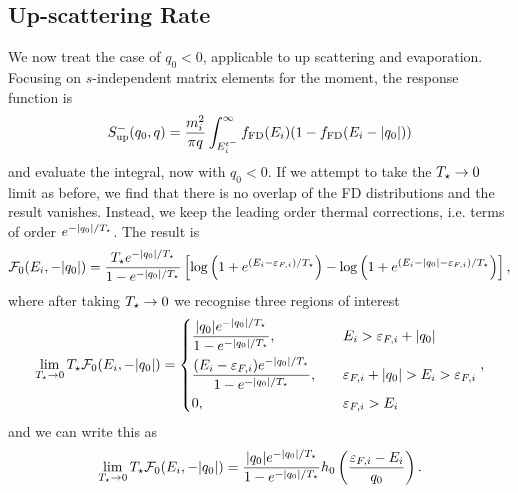 \subsection{Up-scattering Rate}
\label{app:subsec:up_scatter_derivation}

We now treat the case of $q_0<0$, applicable to up scattering and evaporation. Focusing on $s$-independent matrix elements for the moment, the response function is
\begin{equation}
    S^{-}_\mathrm{up}(q_0, q) = \frac{m_i^2}{\pi q}\int_{E_i^{t^-}}^\infty f_{\rm FD}(E_i)(1 - f_{\rm FD}(E_i -|q_0|))
\end{equation}
and evaluate the integral, now with $q_0 <0$. If we attempt to take the $T_\star\rightarrow 0$ limit as before, we find that there is no overlap of the FD distributions and the result vanishes. Instead, we keep the leading order thermal corrections, i.e. terms of order $e^{-|q_0|/T_\star}$. The result is 
\begin{equation}
        \mathcal{F}_0(E_i, -|q_0|) = \frac{T_\star e^{-|q_0|/T_\star}}{1 - e^{-|q_0|/T_\star}} \left[ \log\left( 1 + e^{(E_i-\varepsilon_{F,i})/T_\star}\right) - \log\left( 1 + e^{(E_i-|q_0|-\varepsilon_{F,i})/T_\star}\right)\right],
\end{equation}
where after taking $T_\star \rightarrow 0$ we recognise three regions of interest
\begin{equation}
    \lim_{T_\star \rightarrow 0}T_\star \mathcal{F}_0(E_i, -|q_0|) = 
    \begin{dcases}
        \frac{|q_0| e^{-|q_0|/T_\star}}{1 - e^{-|q_0|/T_\star}},&\quad E_i>\varepsilon_{F,i} +|q_0|\\  
        \frac{(E_i-\varepsilon_{F,i}) e^{-|q_0|/T_\star}}{1 - e^{-|q_0|/T_\star}},&\quad \varepsilon_{F,i} + |q_0| > E_i > \varepsilon_{F,i}\\
        0, & \quad \varepsilon_{F,i}>E_i
    \end{dcases},
\end{equation}
and we can write this as
\begin{equation}
    \lim_{T_\star \rightarrow 0}T_\star \mathcal{F}_0(E_i, -|q_0|) = \frac{|q_0| e^{-|q_0|/T_\star}}{1 - e^{-|q_0|/T_\star}}h_0\left(\frac{\varepsilon_{F,i} - E_i}{q_0}\right).
\end{equation}

